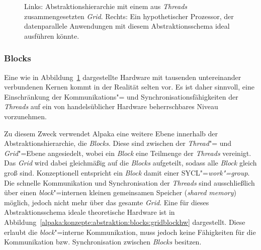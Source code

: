 \begin{figure}
    \caption{Links: Abstraktionshierarchie mit einem aus \textit{Threads}
             zusammengesetzten \textit{Grid}. Rechts: Ein hypothetischer
             Prozessor, der datenparallele Anwendungen mit diesem
             Abstraktionsschema ideal ausführen könnte.
             \cite[nach][18]{worpitz2015}}
    \label{alpaka:konzepte:abstraktion:threads:gridthreadhw}
\end{figure}

\subsubsection{Blocks}

Eine wie in Abbildung~\ref{alpaka:konzepte:abstraktion:threads:gridthreadhw}
dargestellte Hardware mit tausenden untereinander verbundenen Kernen kommt
in der Realität selten vor. Es ist daher sinnvoll, eine Einschränkung der
Kommunikations"= und Synchronisationsfähigkeiten der \textit{Threads} auf ein
von handelsüblicher Hardware beherrschbares Niveau vorzunehmen.

Zu diesem Zweck verwendet Alpaka eine weitere Ebene innerhalb der
Abstraktionshierarchie, die \textit{Blocks}. Diese sind zwischen der
\textit{Thread}"= und \textit{Grid}"=Ebene angesiedelt, wobei ein \textit{Block}
eine Teilmenge der \textit{Threads} vereinigt. Das \textit{Grid} wird dabei
gleichmäßig auf die \textit{Blocks} aufgeteilt, sodass alle \textit{Block}
gleich groß sind. Konzeptionell entspricht ein \textit{Block} damit einer
SYCL"=\textit{work"=group}. Die schnelle Kommunikation und Synchronisation der
\textit{Threads} sind ausschließlich über einen \textit{block}"=internen kleinen
gemeinsamen Speicher (\textit{shared memory}) möglich, jedoch nicht mehr über
das gesamte \textit{Grid}. Eine für dieses Abstraktionsschema ideale
theoretische Hardware ist in
Abbildung~\ref{alpaka:konzepte:abstraktion:blocks:gridblockhw} dargestellt.
Diese erlaubt die \textit{block}"=interne Kommunikation, muss jedoch keine
Fähigkeiten für die Kommunikation bzw. Synchronisation zwischen \textit{Blocks}
besitzen.

